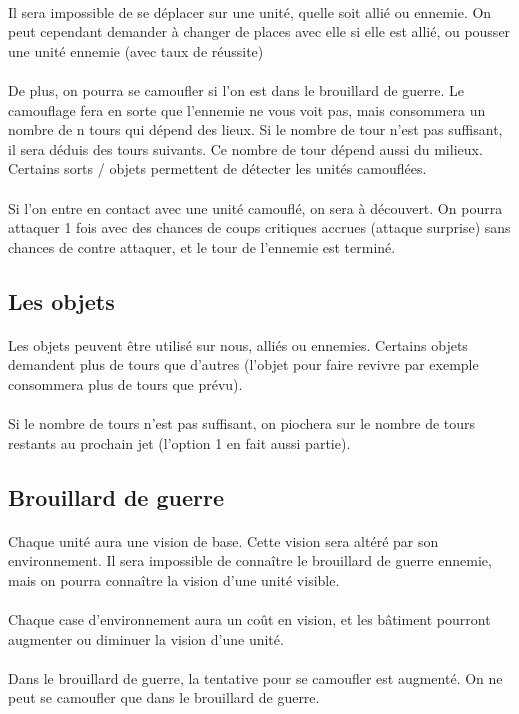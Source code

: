 \paragraph{} Il sera impossible de se déplacer sur une unité, quelle soit allié ou ennemie. On peut cependant demander à changer de places avec elle si elle est allié, ou pousser une unité ennemie (avec taux de réussite) 

\paragraph{} De plus, on pourra se camoufler si l'on est dans le brouillard de guerre. Le camouflage fera en sorte que l'ennemie ne vous voit pas, mais consommera un nombre de n tours qui dépend des lieux. Si le nombre de tour n'est pas suffisant, il sera déduis des tours suivants.
Ce nombre de tour dépend aussi du milieux. Certains sorts / objets permettent de détecter les unités camouflées.
\paragraph{} Si l'on entre en contact avec une unité camouflé, on sera à découvert. On pourra attaquer 1 fois avec des chances de coups critiques accrues (attaque surprise) sans chances de contre attaquer, et le tour de l'ennemie est terminé.

\subsection{Les objets}
\paragraph{} Les objets peuvent être utilisé sur nous, alliés ou ennemies. Certains objets demandent plus de tours que d'autres (l'objet pour faire revivre par exemple consommera plus de tours que prévu).
\paragraph{} Si le nombre de tours n'est pas suffisant, on piochera sur le nombre de tours restants au prochain jet (l'option 1 en fait aussi partie).

\subsection{Brouillard de guerre}
\paragraph{} Chaque unité aura une vision de base. Cette vision sera altéré par son environnement. Il sera impossible de connaître le brouillard de guerre ennemie, mais on pourra connaître la vision d'une unité visible.
\paragraph{} Chaque case d'environnement aura un coût en vision, et les bâtiment pourront augmenter ou diminuer la vision d'une unité.
\paragraph{} Dans le brouillard de guerre, la tentative pour se camoufler est augmenté. On ne peut se camoufler que dans le brouillard de guerre.
